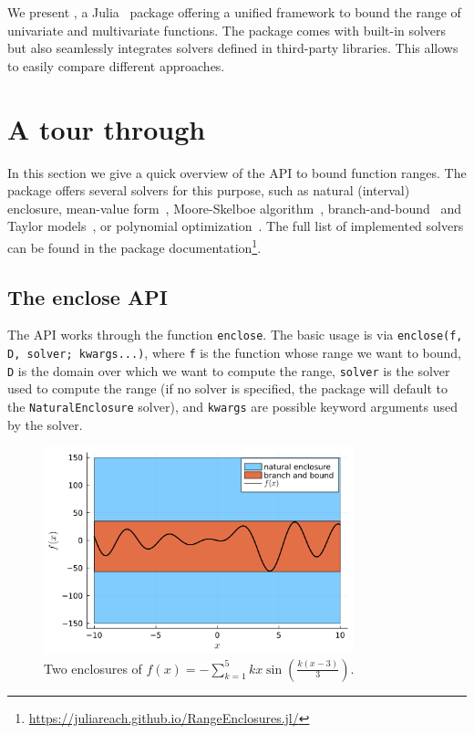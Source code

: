 \documentclass{juliacon}
\begin{document}
\smallskip

We present , a Julia~\cite{BezansonEKS17} package offering a unified framework to bound the range of univariate and multivariate functions. The package comes with built-in solvers but also seamlessly integrates solvers defined in third-party libraries. This allows to easily compare different approaches.



\section{A tour through \RE}

In this section we give a quick overview of the API to bound function ranges. The package offers several solvers for this purpose, such as natural (interval) enclosure, mean-value form~\cite{moore2009introduction}, Moore-Skelboe algorithm~\cite{hansen2003global}, branch-and-bound~\cite{karhbet2017range} and Taylor models~\cite{benet2019taylormodels}, or polynomial optimization~\cite{weisser2019polynomial}. The full list of implemented solvers can be found in the package documentation\footnote{\url{https://juliareach.github.io/RangeEnclosures.jl/}}.


\subsection{The enclose API}

The \emph{\RE} API works through the function \texttt{enclose}.
The basic usage is via \texttt{enclose(f, D, solver; kwargs...)}, where \texttt{f} is the function whose range we want to bound, \texttt{D} is the domain over which we want to compute the range, \texttt{solver} is the solver used to compute the range (if no solver is specified, the package will default to the \texttt{NaturalEnclosure} solver), and \texttt{kwargs} are possible keyword arguments used by the solver.

\begin{figure}[tb]
    \centering
    \includegraphics[width=\linewidth,height=6cm,keepaspectratio]{pic/enclosure_2D}
    \caption{Two enclosures of $f(x) = -\sum_{k=1}^5kx\sin(\frac{k(x-3)}{3})$.}
    \label{fig:enclosure_2D}
\end{figure}
\end{document}
